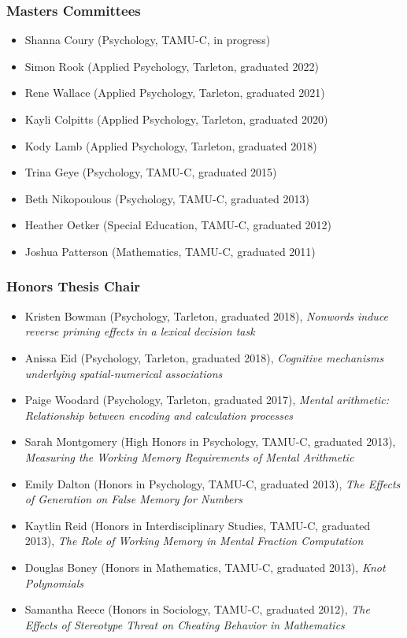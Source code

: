 \documentclass[article,10pt]{article}
\begin{document}
\subsubsection*{Masters Committees}
\label{sec:orgd42542c}
\begin{itemize}
\item Shanna Coury (Psychology, TAMU-C, in progress)
\item Simon Rook (Applied Psychology, Tarleton, graduated 2022)
\item Rene Wallace (Applied Psychology, Tarleton, graduated 2021)
\item Kayli Colpitts (Applied Psychology, Tarleton, graduated 2020)
\item Kody Lamb (Applied Psychology, Tarleton, graduated 2018)
\item Trina Geye (Psychology, TAMU-C, graduated 2015)
\item Beth Nikopoulous (Psychology, TAMU-C, graduated 2013)
\item Heather Oetker (Special Education, TAMU-C, graduated 2012)
\item Joshua Patterson (Mathematics, TAMU-C, graduated 2011)
\end{itemize}

\subsubsection*{Honors Thesis Chair}
\label{sec:org5df47ee}

\begin{itemize}
\item Kristen Bowman (Psychology, Tarleton, graduated 2018), \emph{Nonwords induce reverse priming effects in a lexical decision task}
\item Anissa Eid (Psychology, Tarleton, graduated 2018), \emph{Cognitive mechanisms underlying spatial-numerical associations}
\item Paige Woodard (Psychology, Tarleton, graduated 2017), \emph{Mental arithmetic: Relationship between encoding and calculation processes}
\item Sarah Montgomery (High Honors in Psychology, TAMU-C, graduated 2013), \emph{Measuring the Working Memory Requirements of Mental Arithmetic}
\item Emily Dalton (Honors in Psychology, TAMU-C, graduated 2013), \emph{The Effects of Generation on False Memory for Numbers}
\item Kaytlin Reid (Honors in Interdisciplinary Studies, TAMU-C, graduated 2013), \emph{The Role of Working Memory in Mental Fraction Computation}
\item Douglas Boney (Honors in Mathematics, TAMU-C, graduated 2013), \emph{Knot Polynomials}
\item Samantha Reece (Honors in Sociology, TAMU-C, graduated 2012), \emph{The Effects of Stereotype Threat on Cheating Behavior in Mathematics}
\end{itemize}
\end{document}
